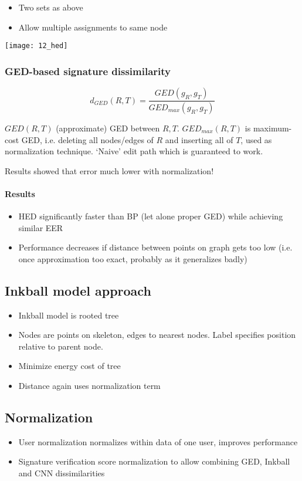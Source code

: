 \begin{itemize}
		\item Two sets as above
		\item Allow multiple assignments to same node
\end{itemize}

\texttt{[image: 12\_hed]}

\subsubsection{GED-based signature dissimilarity}

\[
		d_{GED}(R, T) = \frac{GED(g_R, g_T)}{GED_{max}(g_R, g_T)}
\]

$GED(R, T)$ (approximate) GED between $R, T$. $GED_{max}(R, T)$ is maximum-cost
GED, i.e. deleting all nodes/edges of $R$ and inserting all of $T$, used as
normalization technique. `Naive' edit path which is guaranteed to work.

Results showed that error much lower with normalization!

\paragraph{Results}

\begin{itemize}
		\item HED significantly faster than BP (let alone proper GED) while achieving similar EER
		\item Performance decreases if distance between points on graph gets
				too low (i.e. once approximation too exact, probably as it
				generalizes badly)
\end{itemize}

\subsection{Inkball model approach}

\begin{itemize}
		\item Inkball model is rooted tree
		\item Nodes are points on skeleton, edges to nearest nodes. Label
				specifies position relative to parent node.
		\item Minimize energy cost of tree
		\item Distance again uses normalization term
\end{itemize}

\subsection{Normalization}

\begin{itemize}
		\item User normalization normalizes within data of one user, improves
				performance
		\item Signature verification score normalization to allow combining
				GED, Inkball and CNN dissimilarities
\end{itemize}
